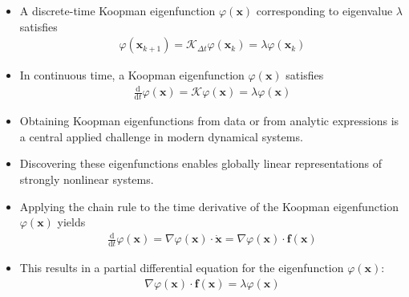 \documentclass[hyperref={pdfpagemode=FullScreen},aspectratio=169]{beamer}
\begin{document}
\begin{frame}{}
\begin{itemize}
\setlength\itemsep{1em}
\item A discrete-time Koopman eigenfunction $\varphi(\mathbf{x})$ corresponding to eigenvalue $\lambda$ satisfies
\begin{align}
\varphi(\mathbf{x}_{k+1}) = \mathcal{K}_{\Delta t}\varphi(\mathbf{x}_k) = \lambda\varphi(\mathbf{x}_k)
\end{align}
\item In continuous time, a Koopman eigenfunction $\varphi(\mathbf{x})$ satisfies
\begin{align}
\frac{\mathrm{d}}{\mathrm{d}t}\varphi(\mathbf{x}) = \mathcal{K}\varphi(\mathbf{x}) = \lambda\varphi(\mathbf{x})
\end{align}
\item Obtaining Koopman eigenfunctions from data or from analytic expressions is a central applied challenge in modern dynamical systems.
\item Discovering these eigenfunctions enables globally linear representations of strongly nonlinear systems.
\item Applying the chain rule to the time derivative of the Koopman eigenfunction $\varphi(\mathbf{x})$ yields
\begin{align}
\frac{\mathrm{d}}{\mathrm{d}t}\varphi(\mathbf{x}) = \nabla\varphi(\mathbf{x}) \cdot \dot{\mathbf{x}} = \nabla\varphi(\mathbf{x}) \cdot \mathbf{f}(\mathbf{x})
\end{align}
\item This results in a partial differential equation for the eigenfunction $\varphi(\mathbf{x})$:
\begin{align}
\nabla\varphi(\mathbf{x}) \cdot \mathbf{f}(\mathbf{x}) = \lambda\varphi(\mathbf{x})
\end{align}

\end{itemize}
\end{frame}
\end{document}
